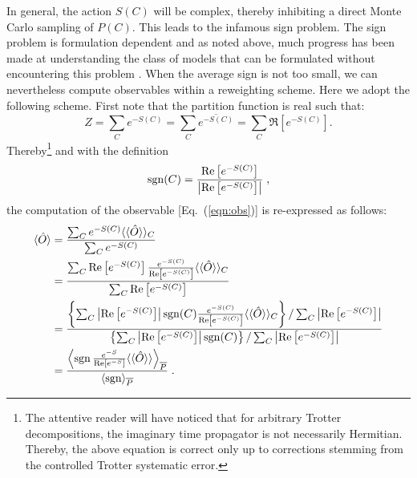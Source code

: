 In general, the action  $S(C) $ will be complex, thereby inhibiting a direct Monte Carlo sampling of $P(C)$.   This leads to the infamous sign problem.     The sign problem is formulation dependent and as noted above, much progress has been made at understanding the class of models that  can be formulated without encountering this problem 
\cite{Wu04,Huffman14,Yao14a,Wei16}.  When the average sign is not too small, we can nevertheless  compute observables within a reweighting scheme.   Here we adopt the following scheme. First  note  that the partition function is real such that: 
\begin{equation}
	Z =   \sum_{C}  e^{-S(C)}    =  \sum_{C}  \overline{e^{-S(C)}} = \sum_{C}  \Re \left[e^{-S(C)} \right]. 
\end{equation}
Thereby\footnote{The attentive reader will have noticed that   for arbitrary Trotter decompositions,  the  imaginary time propagator is not necessarily Hermitian. Thereby, the above equation is correct only up to corrections stemming from the  controlled Trotter systematic error. }
and with the definition
\begin{equation}
\label{Sign.eq}
	 \operatorname{sgn}(C)   =  \frac{   \operatorname{Re} \left[e^{-S(C)} \right]  } {\left| \operatorname{Re} \left[e^{-S(C)} \right]  \right|  }\;,
\end{equation}
the computation of the observable [Eq.~(\ref{eqn:obs})] is re-expressed as follows:
\begin{align}\label{eqn:obs_rw}
\langle \hat{O}  \rangle  &=  \frac{\sum_{C}  e^{-S(C)} \langle \langle \hat{O}  \rangle \rangle_{C} }{\sum_{C}  e^{-S(C)}}       \nonumber \\ 
                          &=  \frac{\sum_{C}   \operatorname{Re} \left[e^{-S(C)} \right]    \frac{e^{-S(C)}} {\operatorname{Re} \left[e^{-S(C)} \right]}  \langle \langle \hat{O}  \rangle \rangle_{C} }{\sum_{C}   \operatorname{Re} \left[e^{-S(C)} \right]}    \nonumber \\ 
          &=
   \frac{
     \left\{
      \sum_{C}  \left| \operatorname{Re} \left[e^{-S(C)} \right]  \right|   \operatorname{sgn}(C)   \frac{e^{-S(C)}} {\operatorname{Re} \left[e^{-S(C)} \right]}  \langle \langle \hat{O}  \rangle \rangle_{C}  \right\}/
            \sum_{C}  \left| \operatorname{Re} \left[ e^{-S(C)} \right] \right|  
          }  
          { 
          \left\{ \sum_{C}  \left|  \operatorname{Re} \left[ e^{-S(C)} \right]   \right|   \operatorname{sgn}(C) \right\}/
            \sum_{C}   \left| \operatorname{Re} \left[ e^{-S(C)} \right] \right|  
          } \nonumber\\
          &=
  	 \frac{  \left\langle  \operatorname{sgn}   \frac{e^{-S}} {\operatorname{Re} \left[e^{-S} \right]}  \langle \langle \hat{O}  \rangle \rangle  \right\rangle_{\overline{P}} } { \langle \operatorname{sgn} \rangle_{\overline{P}}}  \;.      
\end{align} 
